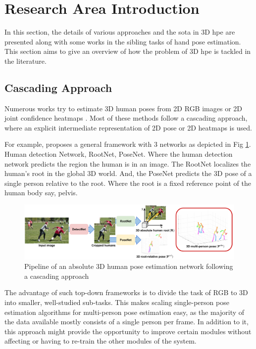 \section{Research Area Introduction}
\label{sec:Research area introduction}

In this section, the details of various approaches and the \ac{sota} in 3D \ac{hpe} are presented along with some works in the sibling tasks of hand pose estimation. This section aims to give an overview of how the problem of 3D \ac{hpe} is tackled in the literature.

\subsection{Cascading Approach}

Numerous works try to estimate 3D human poses from 2D RGB images or 2D joint confidence heatmaps \cite{CameraDistanceAware, poselifter, DistillNRSfM, occlusionVideo, ordinalranking}. Most of these methods follow a cascading approach, where an explicit intermediate representation of 2D pose or 2D heatmaps is used.

For example, \cite{CameraDistanceAware} proposes a general framework with 3 networks as depicted in Fig \ref{fig:CameraDistanceAware}. Human detection Network, RootNet, PoseNet. Where the human detection network predicts the region the human is in an image. The RootNet localizes the human's root in the global 3D world. And, the PoseNet predicts the 3D pose of a single person relative to the root. Where the root is a fixed reference point of the human body say, pelvis.

\begin{figure}[!h]
    \centering
    \includegraphics[width=\linewidth]{figures/background/overall_pipeline.pdf}
    \caption{Pipeline of an absolute 3D human pose estimation network following a cascading approach \cite{CameraDistanceAware}}
    \label{fig:CameraDistanceAware}
\end{figure}

The advantage of such top-down frameworks is to divide the task of RGB to 3D into smaller, well-studied sub-tasks. This makes scaling single-person pose estimation algorithms for multi-person pose estimation easy, as the majority of the data available mostly consists of a single person per frame. In addition to it, this approach might provide the opportunity to improve certain modules without affecting or having to re-train the other modules of the system.

